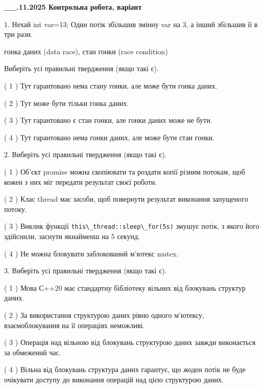 \documentclass[12pt, ukrainian]{article}
\def\code#1{\Verb!#1!}
\begin{document}
\newpage
\begin {large}

\textbf{\_\_.11.2025 Контрольна робота, варіант  }\par


{
1. Нехай int var=13; Один потік збільшив змінну var на 3, а інший збільшив її в три рази.

гонка даних (data race), стан гонки (race condition)

Виберіть усі правильні твердження (якщо такі є).\par
\vspace{2mm}
( 1 ) Тут гарантовано нема стану гонки, але може бути гонка даних.%

( 2 ) Тут може бути тільки гонка даних.%

( 3 ) Тут гарантовано є стан гонки, але гонки даних може не бути.%

( 4 ) Тут гарантовано нема гонки даних, але може бути стан гонки.%


2. Виберіть усі правильні твердження (якщо такі є).\par
\vspace{2mm}

( 1 ) Об’єкт promise можна скопіювати та роздати копії різним потокам, щоб кожен з них міг передати результат своєї роботи.%

( 2 ) Клас thread має засоби, щоб повернути результат виконання запущеного потоку.%

( 3 ) Виклик функції \code{this\_thread::sleep\_for(5s)} змушує потік, з якого його здійснили, заснути якнайменш на 5 секунд.%

( 4 ) Не можна блокувати заблокований м’ютекс mutex.%


3. Виберіть усі правильні твердження (якщо такі є).\par
\vspace{2mm}

( 1 ) Мова С++20 має стандартну бібліотеку вільних від блокувань структур даних.%

( 2 ) За використання структурою даних рівно одного м’ютексу, взаємоблокування на її операціях неможливі.%

( 3 ) Операція над вільною від блокувань структурою даних завжди виконається за обмежений час.%

( 4 ) Вільна від блокувань структура даних гарантує, що жоден потік не буде очікувати доступу до виконання операцій над цією структурою даних.%


}
\end{large}
\end{document}
